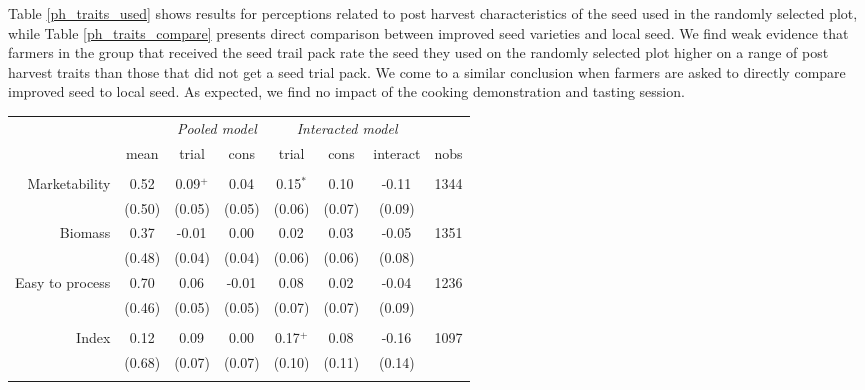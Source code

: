 \documentclass[english]{article}\usepackage[]{graphicx}\usepackage[]{xcolor}
\begin{document}
Table \ref{ph_traits_used} shows results for perceptions related
to post harvest characteristics of the seed used in the randomly selected
plot, while Table \ref{ph_traits_compare} presents direct comparison
between improved seed varieties and local seed. We find weak evidence
that farmers in the group that received the seed trail pack rate the
seed they used on the randomly selected plot higher on a range of
post harvest traits than those that did not get a seed trial pack.
We come to a similar conclusion when farmers are asked to directly
compare improved seed to local seed. As expected, we find no impact
of the cooking demonstration and tasting session.

\begin{sidewaystable}
\caption{Impact on post harvest traits - improved seed compared to local\label{ph_traits_compare}}

\footnotesize
\begin{center}
\begin{tabular}{rccccccc}
\hline\hline
& & \multicolumn{2}{c}{\textit{Pooled model}} & \multicolumn{3}{c}{\textit{Interacted model}} \\
& mean & trial & cons & trial & cons & interact & nobs \\
\hline
\\
Marketability
& 0.52
& 0.09$^{+}$
& 0.04$^{}$ 
& 0.15$^{*}$ 
& 0.10$^{}$
& -0.11$^{}$ & 1344 \\

& (0.50) & (0.05)  & (0.05) & (0.06)  & (0.07)  & (0.09)
 \\

Biomass
& 0.37
& -0.01$^{}$
& 0.00$^{}$ 
& 0.02$^{}$ 
& 0.03$^{}$
& -0.05$^{}$ & 1351 \\

& (0.48) & (0.04)  & (0.04) & (0.06)  & (0.06)  & (0.08)
 \\

Easy to process
& 0.70
& 0.06$^{}$
& -0.01$^{}$ 
& 0.08$^{}$ 
& 0.02$^{}$
& -0.04$^{}$ & 1236 \\

& (0.46) & (0.05)  & (0.05) & (0.07)  & (0.07)  & (0.09)
 \\
\\
Index
& 0.12
& 0.09$^{}$
& 0.00$^{}$ 
& 0.17$^{+}$ 
& 0.08$^{}$
& -0.16$^{}$ & 1097 \\

& (0.68) & (0.07)  & (0.07) & (0.10)  & (0.11)  & (0.14)
 \\
\\


\end{tabular}
\end{center}
\end{sidewaystable}
\end{document}
